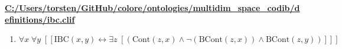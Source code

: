 \documentclass{article}
\begin{document}
\textbf{\url{C:/Users/torsten/GitHub/colore/ontologies/multidim\_space\_codib/definitions/ibc.clif}}

\begin{enumerate}
\item $\forall x\; \forall y\;  \left[ \left[ \textrm{IBC}(x,y) \leftrightarrow \exists z\;  \left[ \left(\textrm{Cont}(z,x) \land \neg \left(\textrm{BCont}(z,x)\right) \land \textrm{BCont}(z,y)\right) \right] \right] \right]$
\end{enumerate}
\end{document}
